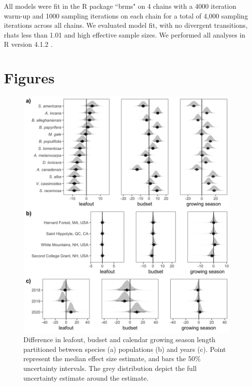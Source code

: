 \documentclass{article}[12pt]
\begin{document}
All models were fit in the R package ``brms" \citep{Burkner2018} on 4 chains with a 4000 iteration warm-up and 1000 sampling iterations on each chain for a total of 4,000 sampling iterations across all chains. We evaluated model fit, with no divergent transitions, rhats less than 1.01 and high effective sample sizes. We performed all analyses in R version 4.1.2 \citep{R2021}.

\newpage
\section{Figures} %

\begin{figure}[h!]
    \centering
 \includegraphics[width=.7\textwidth]{..//analyses/figures/var_parts.jpeg}
    \caption{Difference in leafout, budset and calendar growing season length partitioned between species (a) populations (b) and years (c). Point represent the median effect size estimate, and bars the 50\% uncertainty intervals. The grey distribution depict the full uncertainty estimate around the estimate.}
    \label{fig:vapar}
\end{figure}
\end{document}
